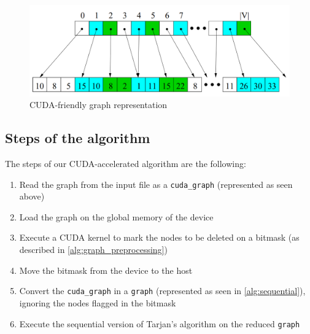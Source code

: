 \begin{figure}
  \begin{center}
    \includegraphics[scale=0.5]{img/cuda_graph.png}
  \end{center}
  \caption{CUDA-friendly graph representation}
  \label{img:cuda_graph}
\end{figure}

\subsection{Steps of the algorithm}
\label{alg:cuda_only}
\noindent The steps of our CUDA-accelerated algorithm are the following:
\begin{enumerate}
  \item Read the graph from the input file as a \verb|cuda_graph| (represented as seen above)
  \item Load the graph on the global memory of the device
  \item Execute a CUDA kernel to mark the nodes to be deleted on a bitmask (as described in \ref{alg:graph_preprocessing})
  \item Move the bitmask from the device to the host
  \item Convert the \verb|cuda_graph| in a \verb|graph| (represented as seen in \ref{alg:sequential}), ignoring the nodes flagged in the bitmask
  \item Execute the sequential version of Tarjan's algorithm on the reduced \verb|graph|
\end{enumerate}
